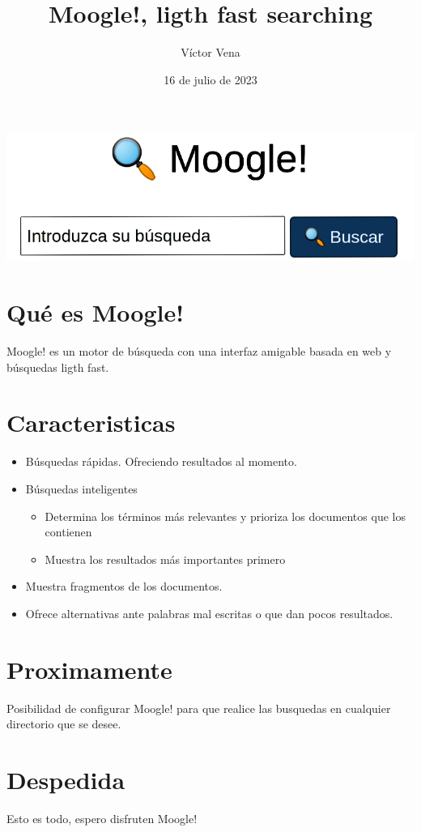 \documentclass{beamer}
\title{Moogle!, ligth fast searching}
\author{Víctor Vena}
\date{16 de julio de 2023}
\begin{document}
\begin{titlepage}
   \begin{center}
    \includegraphics[scale=0.25]{Imagenes/moogle.png}
   \end{center}
\end{titlepage}

\centering

\section{Qué es Moogle!}
Moogle! es un motor de búsqueda con una interfaz amigable basada en web y búsquedas ligth fast.
\pagebreak

\section{Caracteristicas}
\begin{itemize}
    \item Búsquedas rápidas. Ofreciendo resultados al momento.
    \item Búsquedas inteligentes
    \begin{itemize}
        \item Determina los términos más relevantes y prioriza los documentos que los contienen
        \item Muestra los resultados más importantes primero
    \end{itemize}
    \item Muestra fragmentos de los documentos.
    \item Ofrece alternativas ante palabras mal escritas o que dan pocos resultados.
\end{itemize}
\pagebreak

\section{Proximamente}
Posibilidad de configurar Moogle! para que realice las busquedas en cualquier directorio que se desee.\\

\pagebreak

\section{Despedida}
Esto es todo, espero disfruten Moogle!

\pagebreak

\maketitle
\end{document}
